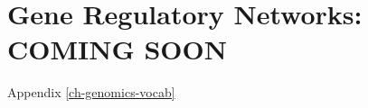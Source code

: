 \chapter{Gene Regulatory Networks: COMING SOON}
\label{ch_gene_reg_net}

Appendix \ref{ch-genomics-vocab}

